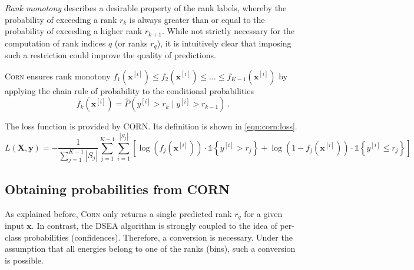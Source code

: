 \emph{Rank monotony} describes a desirable property of the rank labels,
whereby the probability of exceeding a rank $r_k$ is always greater than or equal to the probability of exceeding a higher rank $r_{k+1}$.
%
While not strictly necessary for the computation of rank indices $q$ (or ranks $r_q$),
it is intuitively clear that imposing such a restriction could improve the quality of predictions.

\textsc{Corn} ensures rank monotony
  $f_1(\mathbf{x}^{[i]}) \leq f_2(\mathbf{x}^{[i]}) \leq \ldots \leq f_{K-1}(\mathbf{x}^{[i]})$
by applying the chain rule of probability
to the conditional probabilities
\begin{equation}
  f_k(\mathbf{x}^{[i]}) = \hat{P}\left( y^{[i]} > r_k \mid y^{[i]} > r_{k-1} \right) \ .
\end{equation}




The loss function is provided by CORN.
Its definition is shown in \autoref{eqn:corn:loss}.
\begin{equation}
  \label{eqn:corn:loss}
  L(\mathbf{X}, \mathbf{y}) =
  - \frac{1}{\sum_{j=1}^{K-1} |S_j|}
  \sum_{j=1}^{K-1}
  \sum_{i=1}^{|S_j|}
  \left[
    \log(f_j(\mathbf{x}^{[i]})) · \mathbb{1}\left\{y^{[i]} > r_j\right\}
    +
    \log(1 - f_j(\mathbf{x}^{[i]})) · \mathbb{1}\left\{y^{[i]} \leq r_j\right\}
  \right]
\end{equation}


\subsection{Obtaining probabilities from CORN} %
As explained before,
\textsc{Corn} only returns a single predicted rank $r_q$ for a given input $\mathbf{x}$.
In contrast,
the DSEA algorithm is strongly coupled to the idea of per-class probabilities (confidences).
Therefore, a conversion is necessary.
Under the assumption that all energies belong to one of the ranks (bins),
such a conversion is possible.

